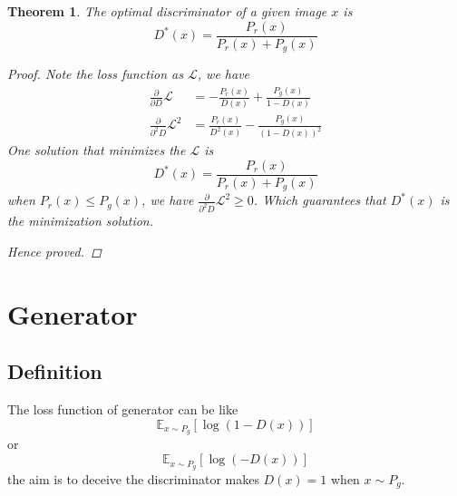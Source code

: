 \documentclass[a4paper]{article}
\newtheorem{theorem}{Theorem}[section]
\begin{document}
\begin{theorem}
    The optimal discriminator of a given image $x$ is
    \begin{equation} \label{eq:Optimal_D}
        D^*(x) = \frac{P_r(x)}{P_r(x) + P_g(x)}
    \end{equation}

    \begin{proof}
        Note the loss function as $\mathcal{L}$, we have
        \begin{equation*}
            \begin{aligned}
                \frac{\partial}{\partial D} \mathcal{L}     & =
                - \frac{P_r(x)}{D(x)}
                + \frac{P_g(x)}{1-D(x)}                         \\
                \frac{\partial}{\partial^2 D} \mathcal{L}^2 & =
                \frac{P_r(x)}{D^2(x)}
                - \frac{P_g(x)}{(1-D(x))^2}
            \end{aligned}
        \end{equation*}
        One solution that minimizes the $\mathcal{L}$ is
        \begin{equation*}
            D^*(x) = \frac{P_r(x)}{P_r(x) + P_g(x)}
        \end{equation*}
        when $P_r(x) \leqslant P_g(x)$, we have $\frac{\partial}{\partial^2 D} \mathcal{L}^2 \geqslant 0$.
        Which guarantees that $D^*(x)$ is the minimization solution.

        Hence proved.
    \end{proof}
\end{theorem}

\section{Generator}

\subsection{Definition}

The loss function of generator can be like
\begin{equation} \label{eq:G_loss0}
    \mathbb{E}_{x\sim P_g} [\log{(1-D(x))}]
\end{equation}
or
\begin{equation} \label{eq:G_loss1}
    \mathbb{E}_{x\sim P_g} [\log{(-D(x))}]
\end{equation}
the aim is to deceive the discriminator makes $D(x) = 1$ when $x \sim P_g$.
\end{document}
